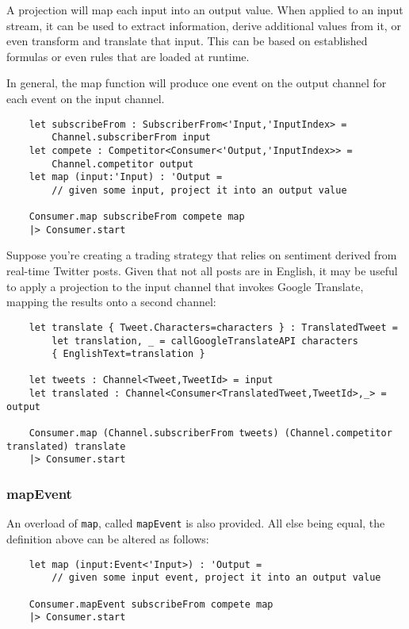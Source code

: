 \documentclass{article}
\begin{document}
A projection will map each input into an output value.  When applied to an input stream, it can be used to extract information, derive additional values from it, or even transform and translate that input.  This can be based on established formulas or even rules that are loaded at runtime.

In general, the map function will produce one event on the output channel for each event on the input channel.

\begin{verbatim}
    let subscribeFrom : SubscriberFrom<'Input,'InputIndex> =
        Channel.subscriberFrom input
    let compete : Competitor<Consumer<'Output,'InputIndex>> =
        Channel.competitor output
    let map (input:'Input) : 'Output =
        // given some input, project it into an output value

    Consumer.map subscribeFrom compete map
    |> Consumer.start
\end{verbatim}

Suppose you're creating a trading strategy that relies on sentiment derived from real-time Twitter posts.  Given that not all posts are in English, it may be useful to apply a projection to the input channel that invokes Google Translate, mapping the results onto a second channel:

\begin{verbatim}
    let translate { Tweet.Characters=characters } : TranslatedTweet =
        let translation, _ = callGoogleTranslateAPI characters
        { EnglishText=translation }

    let tweets : Channel<Tweet,TweetId> = input
    let translated : Channel<Consumer<TranslatedTweet,TweetId>,_> = output
        
    Consumer.map (Channel.subscriberFrom tweets) (Channel.competitor translated) translate
    |> Consumer.start
\end{verbatim}

\subsubsection{mapEvent}

An overload of \texttt{map}, called \texttt{mapEvent} is also provided.  All else being equal, the definition above can be altered as follows:

\begin{verbatim}
    let map (input:Event<'Input>) : 'Output =
        // given some input event, project it into an output value
        
    Consumer.mapEvent subscribeFrom compete map
    |> Consumer.start
\end{verbatim}
\end{document}
